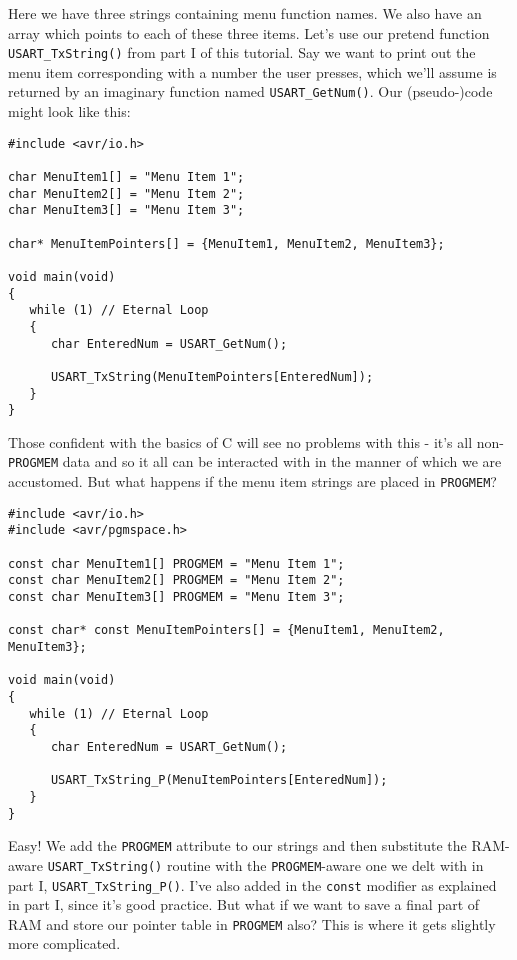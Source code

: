 \documentclass[a4paper,oneside,notitlepage]{book}
\begin{document}
Here we have three strings containing menu function names. We also have an array which points to each of these three items. Let's use our pretend function \lstinline{USART_TxString()} from part I of this tutorial. Say we want to print out the menu item corresponding with a number the user presses, which we'll assume is returned by an imaginary function named \lstinline{USART_GetNum()}. Our (pseudo-)code might look like this:

\begin{center}
\begin{lstlisting}
#include <avr/io.h>

char MenuItem1[] = "Menu Item 1";
char MenuItem2[] = "Menu Item 2";
char MenuItem3[] = "Menu Item 3";

char* MenuItemPointers[] = {MenuItem1, MenuItem2, MenuItem3};

void main(void)
{
   while (1) // Eternal Loop
   {
      char EnteredNum = USART_GetNum();

      USART_TxString(MenuItemPointers[EnteredNum]);
   }
}
\end{lstlisting}
\end{center}

Those confident with the basics of C will see no problems with this - it's all non-\lstinline{PROGMEM} data and so it all can be interacted with in the manner of which we are accustomed. But what happens if the menu item strings are placed in \lstinline{PROGMEM}?

\begin{center}
\begin{lstlisting}
#include <avr/io.h>
#include <avr/pgmspace.h>

const char MenuItem1[] PROGMEM = "Menu Item 1";
const char MenuItem2[] PROGMEM = "Menu Item 2";
const char MenuItem3[] PROGMEM = "Menu Item 3";

const char* const MenuItemPointers[] = {MenuItem1, MenuItem2, MenuItem3};

void main(void)
{
   while (1) // Eternal Loop
   {
      char EnteredNum = USART_GetNum();

      USART_TxString_P(MenuItemPointers[EnteredNum]);
   }
}
\end{lstlisting}
\end{center}

Easy! We add the \lstinline{PROGMEM} attribute to our strings and then substitute the RAM-aware \lstinline{USART_TxString()} routine with the \lstinline{PROGMEM}-aware one we delt with in part I, \lstinline{USART_TxString_P()}. I've also added in the \lstinline{const} modifier as explained in part I, since it's good practice. But what if we want to save a final part of RAM and store our pointer table in \lstinline{PROGMEM} also? This is where it gets slightly more complicated.
\end{document}
